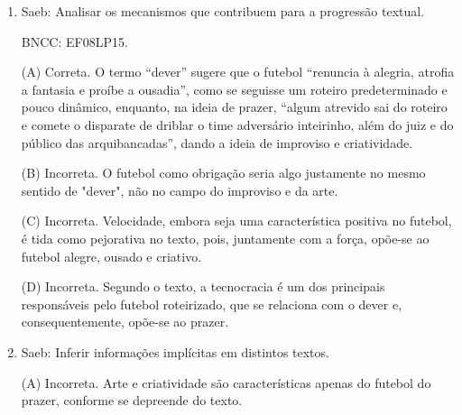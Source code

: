 \begin{enumerate}
(A) Correta. As informações que constam na bula de remédio são
importantes para o correto uso do medicamento. Além disso, sua
finalidade comunicativa é orientar o usuário nesse uso correto, daí a
necessidade de uma linguagem objetiva na exposição das informações do
medicamento e das orientações de uso, para que a saúde não seja posta em
risco pelo mau uso.

(B) Incorreta. A bula de remédio é um texto predominantemente
informativo e expositivo, pois a intenção é que o usuário faça um uso
seguro e correto. Assim, não há intenção de fazer juízo de valor sobre o
uso ou não uso do medicamento, nem sobre suas qualidades ou defeitos.

(C) Incorreta. Não há menção a tempo, espaço, personagens etc. no texto
da bula de remédio, nem relato de acontecimentos, e sim exposição de
informações.

(D) Incorreta. A linguagem figurada expressa sentidos pouco claros e
mais interpretativos, o que não é útil na compreensão dos dados de um
medicamento.


\item

Saeb: Analisar os mecanismos que contribuem para a progressão textual.

BNCC: EF08LP15.

(A) Correta. O termo ``dever'' sugere que o futebol ``renuncia à
alegria, atrofia a fantasia e proíbe a ousadia'', como se seguisse um
roteiro predeterminado e pouco dinâmico, enquanto, na ideia de prazer,
``algum atrevido sai do roteiro e comete o disparate de driblar o time
adversário inteirinho, além do juiz e do público das arquibancadas'',
dando a ideia de improviso e criatividade.

(B) Incorreta. O futebol como obrigação seria algo justamente no mesmo sentido de "dever", não no campo do improviso e da arte.

(C) Incorreta. Velocidade, embora seja uma característica positiva no
futebol, é tida como pejorativa no texto, pois, juntamente com a força,
opõe-se ao futebol alegre, ousado e criativo.

(D) Incorreta. Segundo o texto, a tecnocracia é um dos principais
responsáveis pelo futebol roteirizado, que se relaciona com o dever e,
consequentemente, opõe-se ao prazer.


\item

Saeb: Inferir informações implícitas em distintos textos.

(A) Incorreta. Arte e criatividade são características apenas do futebol
do prazer, conforme se depreende do texto.


\end{enumerate}
